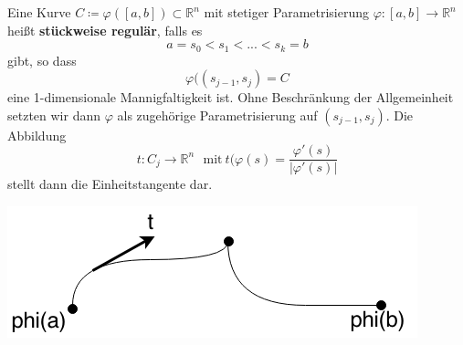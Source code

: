 \begin{definition}
Eine Kurve $C\coloneqq\varphi([a,b])\subset\mathbb{R}^n$ mit 
stetiger Parametrisierung $\varphi:[a,b]\rightarrow\mathbb{R}^n$ heißt \textbf{stückweise regulär}, falls es
\begin{equation*}
	a=s_0 < s_1 < ... < s_k = b
\end{equation*}
gibt, so dass
\begin{equation*}
	\varphi((s_{j-1},s_j)=C
\end{equation*}
eine 1-dimensionale Mannigfaltigkeit ist. Ohne Beschränkung der 
Allgemeinheit setzten wir dann $\varphi$ als zugehörige 
Parametrisierung auf $(s_{j-1},s_j)$. Die Abbildung 
\begin{equation*}
	t:C_j\rightarrow\mathbb{R}^n \ \ \ 
	\mathrm{mit\ }t(\varphi(s)=
	\frac{\varphi'(s)}{|\varphi'(s)|}	
\end{equation*}
stellt dann die Einheitstangente dar.
\begin{center}
	\includegraphics[scale=0.5]{pictures/010-01.png}
\end{center}
\end{definition}

